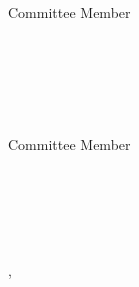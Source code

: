\begin{flushright}
        \vspace{0.2cm}
        \underline{\hspace{8cm}} \\
        \MakeUppercase{\thirdAdvisorName} \\
        \thirdAdvisorSchoolName \\
        \thirdAdvisorSchoolDepartment \\
        \thirdAdvisorSchoolPlace \\
        Committee Member 
\end{flushright}

\begin{flushright}
        \vspace{0.2cm}
        \underline{\hspace{8cm}} \\
        \MakeUppercase{\fourthAdvisorName} \\
        \fourthAdvisorSchoolName \\
        \fourthAdvisorSchoolDepartment \\
        \fourthAdvisorSchoolPlace \\
        Committee Member 
\end{flushright}

\begin{center}
        \vspace{0.2cm}
        \underline{\hspace{8cm}} \\
        \MakeUppercase{\programDirectorName} \\
        \programDirectorRole \\
        \schoolDepartment
\end{center}

\begin{center}
    \textbf{\schoolName}\\
    \textbf{\schoolPlace}, \textbf{\thesisDate} 
\end{center}


